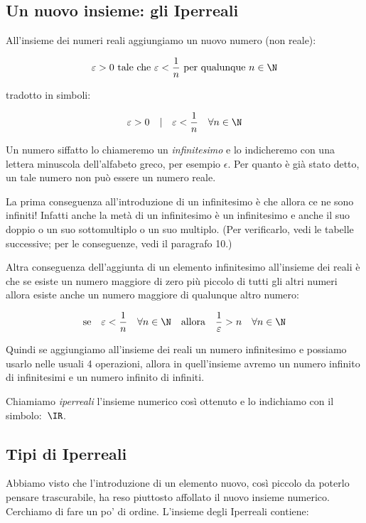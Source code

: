 \subsection{Un nuovo insieme: gli Iperreali}
\label{subsec:insnum_iperreali}

All'insieme dei numeri reali aggiungiamo un nuovo numero (non reale):

\[\varepsilon > 0 \text{ tale che } 
\varepsilon < \frac{1}{n} \text{ per qualunque } n \in \N\]

tradotto in simboli:

\[\varepsilon > 0 \quad | \quad \varepsilon < \frac{1}{n} \quad \forall n \in 
\N\]

Un numero siffatto lo chiameremo un \emph{infinitesimo} e lo indicheremo 
con una lettera minuscola dell'alfabeto greco, per esempio $\epsilon$.
Per quanto è già stato detto, un tale numero non può essere un numero
reale. 

La prima conseguenza all'introduzione di un infinitesimo è che allora ce ne 
sono infiniti! Infatti anche la metà di un infinitesimo è un infinitesimo e 
anche il suo doppio o un suo sottomultiplo o un suo multiplo. (Per verificarlo,
vedi le tabelle successive; per le conseguenze, vedi il paragrafo 10.) 

Altra conseguenza dell'aggiunta di un elemento infinitesimo all'insieme dei 
reali è che se esiste un numero maggiore di zero più piccolo di tutti gli altri 
numeri allora esiste anche un numero maggiore di qualunque altro numero:

\[\text{se} \quad \varepsilon < \frac{1}{n} \quad \forall n \in \N 
\quad \text{allora} \quad \frac{1}{\varepsilon} > n \quad \forall n 
\in \N\]

Quindi se aggiungiamo all'insieme dei reali un numero infinitesimo e possiamo 
usarlo nelle usuali 4 operazioni, allora in quell'insieme avremo un 
numero infinito di infinitesimi e un numero infinito di infiniti.

Chiamiamo \emph{iperreali} l'insieme numerico così ottenuto e lo indichiamo con 
il simbolo:~$\IR$.

\subsection{Tipi di Iperreali}
\label{subsec:insnum_iperreali}

Abbiamo visto che l'introduzione di un elemento nuovo, così piccolo
da poterlo pensare trascurabile, ha 
reso piuttosto affollato il nuovo insieme numerico. Cerchiamo di fare un po' 
di ordine. L'insieme degli Iperreali contiene:

